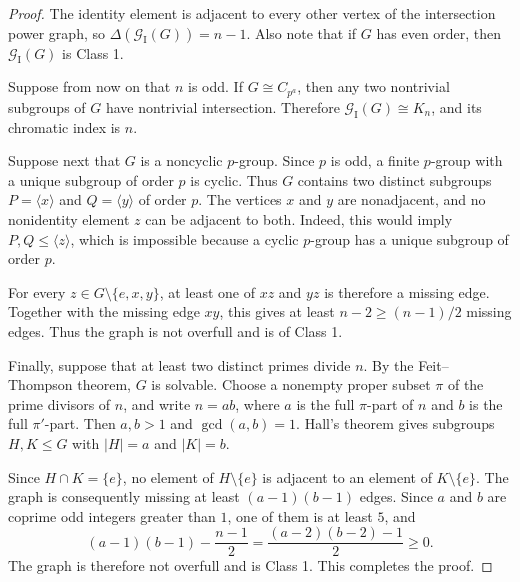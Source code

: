 \documentclass[10pt,a4paper]{amsart}
\begin{document}
\begin{proof}
The identity element is adjacent to every other vertex of the
intersection power graph, so
$\Delta(\mathscr{G}_{\mathrm{I}}(G))=n-1$. Also note that if $G$ has even order, then $\mathscr{G}_{\mathrm{I}}(G)$ is Class 1. 

Suppose from now on that $n$ is
odd. If $G\cong C_{p^a}$, then any two nontrivial subgroups of $G$ have
nontrivial intersection. Therefore
$\mathscr{G}_{\mathrm{I}}(G)\cong K_n$, and its chromatic index is $n$.

Suppose next that $G$ is a noncyclic $p$-group. Since $p$ is odd, a finite
$p$-group with a unique subgroup of order $p$ is cyclic. Thus $G$ contains
two distinct subgroups $P=\langle x\rangle$ and $Q=\langle y\rangle$ of
order $p$. The vertices $x$ and $y$ are nonadjacent, and no nonidentity
element $z$ can be adjacent to both. Indeed, this would imply
$P,Q\leq\langle z\rangle$, which is impossible because a cyclic $p$-group
has a unique subgroup of order $p$.

For every $z\in G\setminus\{e,x,y\}$, at least one of $xz$ and $yz$ is
therefore a missing edge. Together with the missing edge $xy$, this gives at
least $n-2\geq(n-1)/2$ missing edges. Thus the graph is not overfull and is
of Class 1.

Finally, suppose that at least two distinct primes divide $n$. By the
Feit--Thompson theorem, $G$ is solvable. Choose a
nonempty proper subset $\pi$ of the prime divisors of $n$, and write $n=ab$,
where $a$ is the full $\pi$-part of $n$ and $b$ is the full $\pi'$-part.
Then $a,b>1$ and $\gcd(a,b)=1$. Hall's theorem gives
subgroups $H,K\leq G$ with $|H|=a$ and $|K|=b$.

Since $H\cap K=\{e\}$, no element of $H\setminus\{e\}$ is adjacent to an
element of $K\setminus\{e\}$. The graph is consequently missing at least
$(a-1)(b-1)$ edges. Since $a$ and $b$ are coprime odd integers greater than
$1$, one of them is at least $5$, and
\[
 (a-1)(b-1)-\frac{n-1}{2}
   =\frac{(a-2)(b-2)-1}{2}\geq 0.
\]
The graph is therefore not overfull and is Class 1. This completes the proof. 
\end{proof}
\end{document}
